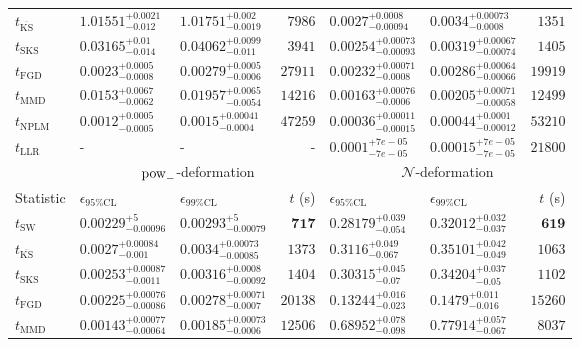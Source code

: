 \begin{tabular}{l|llr|llr}
	$t_{\overline{\mathrm{KS}}}$ & $1.01551_{-0.012}^{+0.0021}$ & $1.01751_{-0.0019}^{+0.002}$ & $7986$ & $0.0027_{-0.00094}^{+0.0008}$ & $0.0034_{-0.0008}^{+0.00073}$ & $1351$ \\
	$t_{\mathrm{SKS}}$ & $0.03165_{-0.014}^{+0.01}$ & $0.04062_{-0.011}^{+0.0099}$ & $3941$ & $0.00254_{-0.00093}^{+0.00073}$ & $0.00319_{-0.00074}^{+0.00067}$ & $1405$ \\
	$t_{\mathrm{FGD}}$ & ${\mathbf{0.0023_{-0.0008}^{+0.0005}}}$ & ${\mathbf{0.00279_{-0.0006}^{+0.0005}}}$ & $27911$ & $0.00232_{-0.0008}^{+0.00071}$ & $0.00286_{-0.00066}^{+0.00064}$ & $19919$ \\
	$t_{\mathrm{MMD}}$ & $0.0153_{-0.0062}^{+0.0067}$ & $0.01957_{-0.0054}^{+0.0065}$ & $14216$ & ${\mathbf{0.00163_{-0.0006}^{+0.00076}}}$ & ${\mathbf{0.00205_{-0.00058}^{+0.00071}}}$ & $12499$ \\
\rowcolor{red!35}	$t_{\mathrm{NPLM}}$ & $0.0012_{-0.0005}^{+0.0005}$ & $0.0015_{-0.0004}^{+0.00041}$ & $47259$ & $0.00036_{-0.00015}^{+0.00011}$ & $0.00044_{-0.00012}^{+0.0001}$ & $53210$ \\
	$t_{\mathrm{LLR}}$ & - & - & - & $0.0001_{-7e-05}^{+7e-05}$ & $0.00015_{-7e-05}^{+7e-05}$ & $21800$ \\
	\toprule
	\multicolumn{1}{c}{} & \multicolumn{3}{c}{$\rm{pow}_{-}$-deformation} & \multicolumn{3}{c}{$\mathcal{N}$-deformation} \\
	Statistic & $\epsilon_{95\%\mathrm{CL}}$ & $\epsilon_{99\%\mathrm{CL}}$ & $t$ (s) & $\epsilon_{95\%\mathrm{CL}}$ & $\epsilon_{99\%\mathrm{CL}}$ & $t$ (s) \\
	\midrule
	$t_{\mathrm{SW}}$ & $0.00229_{-0.00096}^{+5}$ & $0.00293_{-0.00079}^{+5}$ & ${\mathbf{717}}$ & $0.28179_{-0.054}^{+0.039}$ & $0.32012_{-0.037}^{+0.032}$ & ${\mathbf{619}}$ \\
	$t_{\overline{\mathrm{KS}}}$ & $0.0027_{-0.001}^{+0.00084}$ & $0.0034_{-0.00085}^{+0.00073}$ & $1373$ & $0.3116_{-0.067}^{+0.049}$ & $0.35101_{-0.049}^{+0.042}$ & $1063$ \\
	$t_{\mathrm{SKS}}$ & $0.00253_{-0.0011}^{+0.00087}$ & $0.00316_{-0.00092}^{+0.0008}$ & $1404$ & $0.30315_{-0.07}^{+0.045}$ & $0.34204_{-0.05}^{+0.037}$ & $1102$ \\
	$t_{\mathrm{FGD}}$ & $0.00225_{-0.00086}^{+0.00076}$ & $0.00278_{-0.0007}^{+0.00071}$ & $20138$ & ${\mathbf{0.13244_{-0.023}^{+0.016}}}$ & ${\mathbf{0.1479_{-0.016}^{+0.011}}}$ & $15260$ \\
	$t_{\mathrm{MMD}}$ & ${\mathbf{0.00143_{-0.00064}^{+0.00077}}}$ & ${\mathbf{0.00185_{-0.0006}^{+0.00073}}}$ & $12506$ & $0.68952_{-0.098}^{+0.078}$ & $0.77914_{-0.067}^{+0.057}$ & $8037$ \\

\end{tabular}
